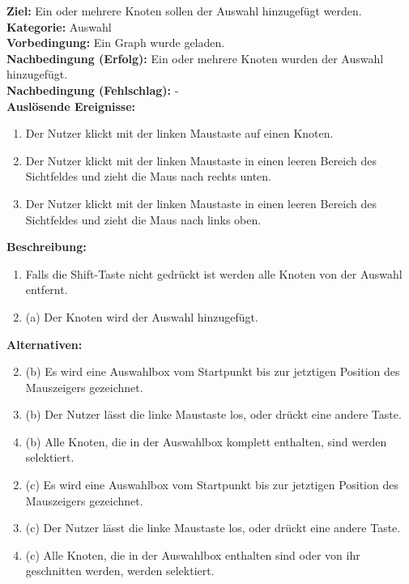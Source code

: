 \label{fa:selekt_knoten}
\textbf{Ziel:} Ein oder mehrere Knoten sollen der Auswahl hinzugefügt werden. \\
\textbf{Kategorie:} Auswahl \\
\textbf{Vorbedingung:} Ein Graph wurde geladen. \\
\textbf{Nachbedingung (Erfolg):} Ein oder mehrere Knoten wurden der Auswahl hinzugefügt. \\
\textbf{Nachbedingung (Fehlschlag):} - \\
\textbf{Auslösende Ereignisse:}
\begin{enumerate}[nolistsep, label=(\alph*)]
  \item Der Nutzer klickt mit der linken Maustaste auf einen Knoten.
  \item Der Nutzer klickt mit der linken Maustaste in einen leeren Bereich des Sichtfeldes und zieht die Maus nach rechts unten.
  \item Der Nutzer klickt mit der linken Maustaste in einen leeren Bereich des Sichtfeldes und zieht die Maus nach links oben.
\end{enumerate}
\textbf{Beschreibung:}
\begin{enumerate}[nolistsep]
  \item Falls die Shift-Taste nicht gedrückt ist werden alle Knoten von der Auswahl entfernt.
  \item (a) Der Knoten wird der Auswahl hinzugefügt.
\end{enumerate}
\textbf{Alternativen:}
\begin{enumerate}[nolistsep]
  \setcounter{enumi}{1}
  \item (b) Es wird eine Auswahlbox vom Startpunkt bis zur jetztigen Position des Mauszeigers gezeichnet.
  \item (b) Der Nutzer lässt die linke Maustaste los, oder drückt eine andere Taste.
  \item (b) Alle Knoten, die in der Auswahlbox komplett enthalten, sind werden selektiert.
\end{enumerate}
\begin{enumerate}[nolistsep]
  \setcounter{enumi}{1}
  \item (c) Es wird eine Auswahlbox vom Startpunkt bis zur jetztigen Position des Mauszeigers gezeichnet.
  \item (c) Der Nutzer lässt die linke Maustaste los, oder drückt eine andere Taste.
  \item (c) Alle Knoten, die in der Auswahlbox enthalten sind oder von ihr geschnitten werden, werden selektiert.
\end{enumerate}

